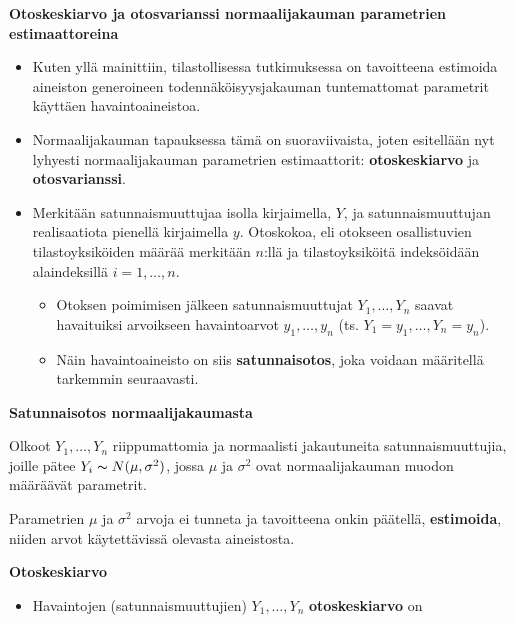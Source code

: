 \documentclass[
]{book}
\providecommand{\tightlist}{%
  \setlength{\itemsep}{0pt}\setlength{\parskip}{0pt}}
\begin{document}
\textbf{Otoskeskiarvo ja otosvarianssi normaalijakauman parametrien estimaattoreina}

\begin{itemize}
\tightlist
\item
  Kuten yllä mainittiin, tilastollisessa tutkimuksessa on tavoitteena estimoida aineiston generoineen todennäköisyysjakauman tuntemattomat parametrit käyttäen havaintoaineistoa.
\item
  Normaalijakauman tapauksessa tämä on suoraviivaista, joten esitellään nyt lyhyesti normaalijakauman parametrien estimaattorit: \textbf{otoskeskiarvo} ja \textbf{otosvarianssi}.
\item
  Merkitään satunnaismuuttujaa isolla kirjaimella, \(Y\), ja satunnaismuuttujan realisaatiota pienellä kirjaimella \(y\). Otoskokoa, eli otokseen osallistuvien tilastoyksiköiden määrää merkitään \(n\):llä ja tilastoyksiköitä indeksöidään alaindeksillä \(i=1,\ldots,n\).

  \begin{itemize}
  \tightlist
  \item
    Otoksen poimimisen jälkeen satunnaismuuttujat \(Y_1, \ldots, Y_n\) saavat havaituiksi arvoikseen havaintoarvot \(y_1, \ldots, y_n\) (ts. \(Y_1=y_1, \ldots, Y_n = y_n\)).
  \item
    Näin havaintoaineisto on siis \textbf{satunnaisotos}, joka voidaan määritellä tarkemmin seuraavasti.
  \end{itemize}
\end{itemize}

\begin{defblock}{}
\textbf{Satunnaisotos normaalijakaumasta}

Olkoot \(Y_1, \ldots, Y_n\) riippumattomia ja normaalisti jakautuneita satunnaismuuttujia, joille pätee \(Y_i \thicksim N(\mu,\sigma^2)\), jossa \(\mu\) ja \(\sigma^2\) ovat normaalijakauman muodon määräävät parametrit.

Parametrien \(\mu\) ja \(\sigma^2\) arvoja ei tunneta ja tavoitteena onkin päätellä, \textbf{estimoida}, niiden arvot käytettävissä olevasta aineistosta.

\end{defblock}

\textbf{Otoskeskiarvo}

\begin{itemize}
\tightlist
\item
  Havaintojen (satunnaismuuttujien) \(Y_1, \ldots, Y_n\) \textbf{otoskeskiarvo} on
\end{itemize}
\end{document}
